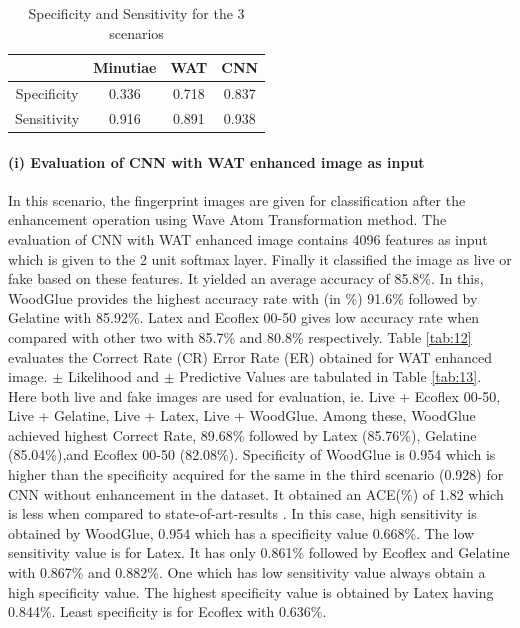 \begin{table}[h]
\caption {Specificity and Sensitivity for the 3 scenarios} \label{tab:5} 
\begin{center}
\begin{tabular}{|c|c|c|c|} 
 \hline
& Minutiae & WAT & CNN\\
  \hline
Specificity & 0.336 & 0.718 & 0.837\\ 
 \hline
Sensitivity & 0.916 &0.891 & 0.938\\
\hline
\end{tabular}
\end{center}
\end{table}
\textbf{}\paragraph{(i) Evaluation of CNN with WAT enhanced image as input}
In this scenario, the fingerprint images are given for classification after the enhancement operation using Wave Atom Transformation method. The evaluation of CNN with WAT enhanced image contains 4096 features as input which is given to the 2 unit softmax layer. Finally it classified the image as live or fake based on these features. It yielded an average accuracy of 85.8\%. In this, WoodGlue provides the highest accuracy rate with (in \%) 91.6\% followed by Gelatine with 85.92\%. Latex and Ecoflex 00-50 gives low accuracy rate when compared with other two with 85.7\% and 80.8\% respectively. Table \ref{tab:12} evaluates the Correct Rate (CR) Error Rate (ER) obtained for WAT enhanced image. $\pm$  Likelihood and   $\pm$  Predictive Values are tabulated in Table \ref{tab:13}. Here both live and fake images are used for evaluation, ie. Live + Ecoflex 00-50, Live + Gelatine, Live + Latex, Live + WoodGlue. Among these, WoodGlue achieved highest Correct Rate, 89.68\% followed by Latex (85.76\%), Gelatine (85.04\%),and Ecoflex 00-50 (82.08\%). Specificity of WoodGlue is 0.954 which is higher than the specificity acquired for the same in the third scenario (0.928) for CNN without enhancement in the dataset. It obtained an ACE(\%) of 1.82 which is less when compared to state-of-art-results \cite{18}. In this case, high sensitivity is obtained by WoodGlue, 0.954 which has a specificity value 0.668\%. The low sensitivity value is for Latex. It has only 0.861\% followed by Ecoflex and Gelatine with 0.867\% and 0.882\%. One which has low sensitivity value always obtain a high specificity value. The highest specificity value is obtained by Latex having 0.844\%. Least specificity is for Ecoflex with 0.636\%.   

